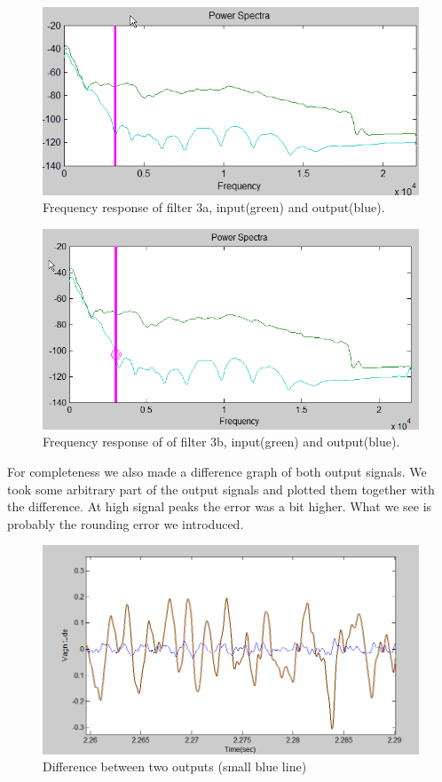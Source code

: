 \documentclass[a4paper,twoside,11pt, fleqn]{article}
\begin{document}
\begin{figure}[h]
	\includegraphics[scale = 0.5]{Images/3a_powerspectra}
    \caption{Frequency response of filter 3a, input(green) and output(blue).}
\end{figure}

\begin{figure}[h]
	\includegraphics[scale = 0.45]{Images/3b_powerspectra}
    \caption{Frequency response of of filter 3b, input(green) and output(blue).}
\end{figure}
For completeness we also made a difference graph of both output signals. We took some arbitrary part of the output signals and plotted them together with the difference. At high signal peaks the error was a bit higher. What we see is probably the rounding error we introduced.

\begin{figure}[h]
	\includegraphics[scale = 0.50]{Images/3b_difference}
    \caption{Difference between two outputs (small blue line)}
\end{figure}
\end{document}
